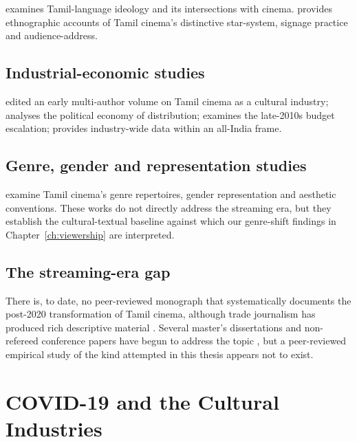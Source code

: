 \citet{ramaswamy1997} examines Tamil-language ideology and its
intersections with cinema.  \citet{nakassis2010,nakassis2017}
provides ethnographic accounts of Tamil cinema's distinctive
star-system, signage practice and audience-address.

\subsection{Industrial-economic studies}

\citet{velayutham2008} edited an early multi-author volume on Tamil
cinema as a cultural industry; \citet{krishnan2009} analyses the
political economy of distribution; \citet{ravindran2018} examines
the late-2010s budget escalation; \citet{kohlikhandekar2013}
provides industry-wide data within an all-India frame.

\subsection{Genre, gender and representation studies}

\citet{rajan2002,velayutham2008,nakassis2017,prasad2014,
sundar2017tamil} examine Tamil cinema's genre repertoires, gender
representation and aesthetic conventions.  These works do not
directly address the streaming era, but they establish the
cultural-textual baseline against which our genre-shift findings in
Chapter~\ref{ch:viewership} are interpreted.

\subsection{The streaming-era gap}

There is, to date, no peer-reviewed monograph that systematically
documents the post-2020 transformation of Tamil cinema, although
trade journalism has produced rich descriptive material
\citep{filmcompanion2021directott,filmcompanion2022mid,
behindwoods2023,galatta2023}.  Several master's dissertations and
non-refereed conference papers have begun to address the topic
\citep{krishnan2022mphil,raja2023conference,sundaresan2023case},
but a peer-reviewed empirical study of the kind attempted in this
thesis appears not to exist.

\section{COVID-19 and the Cultural Industries}
\label{sec:covid_cultural}

